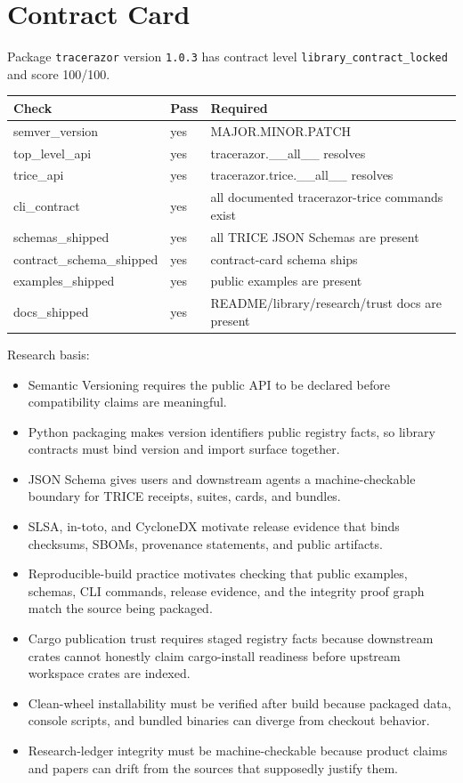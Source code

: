 \section{Contract Card}
Package \texttt{tracerazor} version \texttt{1.0.3} has contract level \texttt{library\_contract\_locked} and score 100/100.

\begin{tabular}{lll}
Check & Pass & Required \\
\hline
semver\_version & yes & MAJOR.MINOR.PATCH \\
top\_level\_api & yes & tracerazor.\_\_all\_\_ resolves \\
trice\_api & yes & tracerazor.trice.\_\_all\_\_ resolves \\
cli\_contract & yes & all documented tracerazor-trice commands exist \\
schemas\_shipped & yes & all TRICE JSON Schemas are present \\
contract\_schema\_shipped & yes & contract-card schema ships \\
examples\_shipped & yes & public examples are present \\
docs\_shipped & yes & README/library/research/trust docs are present \\
\end{tabular}

\noindent Research basis:
\begin{itemize}
\item Semantic Versioning requires the public API to be declared before compatibility claims are meaningful.
\item Python packaging makes version identifiers public registry facts, so library contracts must bind version and import surface together.
\item JSON Schema gives users and downstream agents a machine-checkable boundary for TRICE receipts, suites, cards, and bundles.
\item SLSA, in-toto, and CycloneDX motivate release evidence that binds checksums, SBOMs, provenance statements, and public artifacts.
\item Reproducible-build practice motivates checking that public examples, schemas, CLI commands, release evidence, and the integrity proof graph match the source being packaged.
\item Cargo publication trust requires staged registry facts because downstream crates cannot honestly claim cargo-install readiness before upstream workspace crates are indexed.
\item Clean-wheel installability must be verified after build because packaged data, console scripts, and bundled binaries can diverge from checkout behavior.
\item Research-ledger integrity must be machine-checkable because product claims and papers can drift from the sources that supposedly justify them.
\end{itemize}

